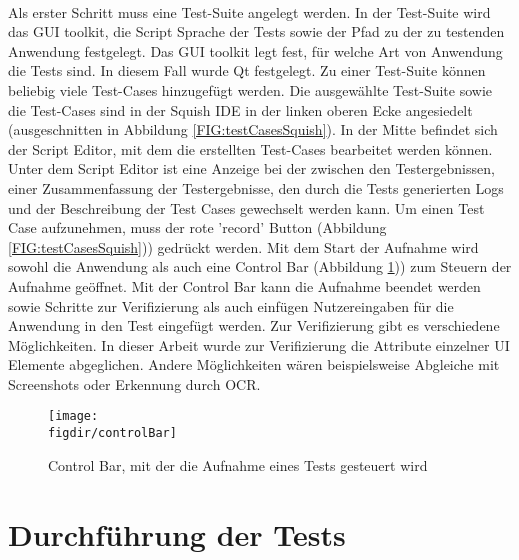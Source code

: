 		\paragraph{} Als erster Schritt muss eine Test-Suite angelegt werden. In der Test-Suite wird das GUI toolkit, die Script Sprache der Tests sowie der Pfad zu der zu testenden Anwendung festgelegt. Das GUI toolkit legt fest, für welche Art von Anwendung die Tests sind. In diesem Fall wurde Qt festgelegt. Zu einer Test-Suite können beliebig viele Test-Cases hinzugefügt werden. Die ausgewählte Test-Suite sowie die Test-Cases sind in der Squish IDE in der linken oberen Ecke angesiedelt (ausgeschnitten in Abbildung \ref{FIG:testCasesSquish}). In der Mitte befindet sich der Script Editor, mit dem die erstellten Test-Cases bearbeitet werden können. Unter dem Script Editor ist eine Anzeige bei der zwischen den Testergebnissen, einer Zusammenfassung der Testergebnisse, den durch die Tests generierten Logs und der Beschreibung der Test Cases gewechselt werden kann. Um einen Test Case aufzunehmen, muss der rote 'record' Button (Abbildung \ref{FIG:testCasesSquish})) gedrückt werden. Mit dem Start der Aufnahme wird sowohl die Anwendung als auch eine Control Bar (Abbildung \ref{FIG:controlBar})) zum Steuern der Aufnahme geöffnet. Mit der Control Bar kann die Aufnahme beendet werden sowie Schritte zur Verifizierung als auch einfügen Nutzereingaben für die Anwendung in den Test eingefügt werden. Zur Verifizierung gibt es verschiedene Möglichkeiten. In dieser Arbeit wurde zur Verifizierung die Attribute einzelner UI Elemente abgeglichen. Andere Möglichkeiten wären beispielsweise Abgleiche mit Screenshots oder Erkennung durch OCR.
		
		\begin{figure}[t]		
			\centering
			\texttt{[image: \\figdir/controlBar]}
			
			\caption[Squish Control Bar]
			{Control Bar, mit der die Aufnahme eines Tests gesteuert wird}
			\label{FIG:controlBar}
		\end{figure}
		\FloatBarrier
		
		\section{Durchführung der Tests}
